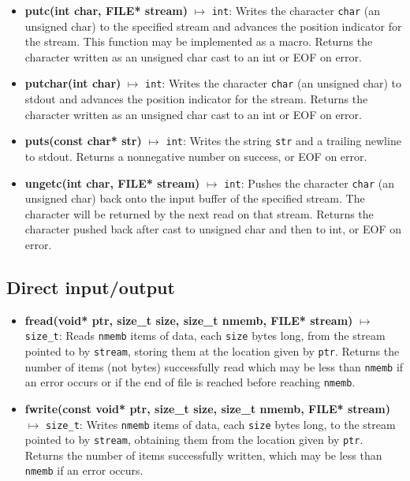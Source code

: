 \documentclass{report}
\begin{document}
\begin{itemize}
        \item \textbf{putc(int char, FILE* stream)} $\mapsto$ \texttt{int}: Writes the character \texttt{char} (an unsigned char) to the specified stream and advances the position indicator for the stream. This function may be implemented as a macro. Returns the character written as an unsigned char cast to an int or EOF on error.
        \item \textbf{putchar(int char)} $\mapsto$ \texttt{int}: Writes the character \texttt{char} (an unsigned char) to stdout and advances the position indicator for the stream. Returns the character written as an unsigned char cast to an int or EOF on error.
        \item \textbf{puts(const char* str)} $\mapsto$ \texttt{int}: Writes the string \texttt{str} and a trailing newline to stdout. Returns a nonnegative number on success, or EOF on error.
        \item \textbf{ungetc(int char, FILE* stream)} $\mapsto$ \texttt{int}: Pushes the character \texttt{char} (an unsigned char) back onto the input buffer of the specified stream. The character will be returned by the next read on that stream. Returns the character pushed back after cast to unsigned char and then to int, or EOF on error.
    \end{itemize}


    \bigbreak \noindent 
    \subsection{Direct input/output}
    \begin{itemize}
        \item \textbf{fread(void* ptr, size\_t size, size\_t nmemb, FILE* stream)} $\mapsto$ \texttt{size\_t}: Reads \texttt{nmemb} items of data, each \texttt{size} bytes long, from the stream pointed to by \texttt{stream}, storing them at the location given by \texttt{ptr}. Returns the number of items (not bytes) successfully read which may be less than \texttt{nmemb} if an error occurs or if the end of file is reached before reaching \texttt{nmemb}.
        \item \textbf{fwrite(const void* ptr, size\_t size, size\_t nmemb, FILE* stream)} $\mapsto$ \texttt{size\_t}: Writes \texttt{nmemb} items of data, each \texttt{size} bytes long, to the stream pointed to by \texttt{stream}, obtaining them from the location given by \texttt{ptr}. Returns the number of items successfully written, which may be less than \texttt{nmemb} if an error occurs.
    \end{itemize}
\end{document}
